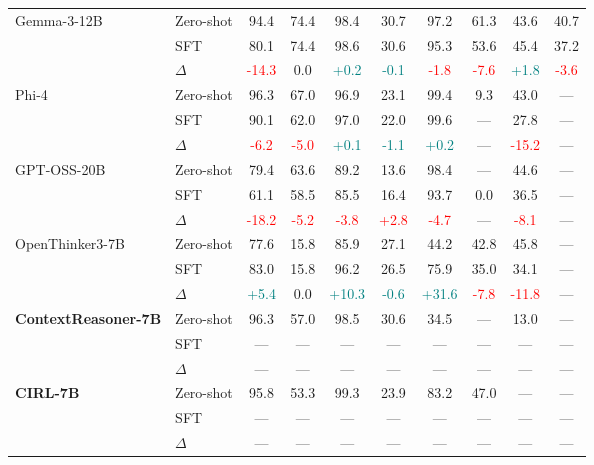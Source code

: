 \begin{table}[t]
\begin{tabular}{llcccccccc}
\addlinespace
Gemma-3-12B & Zero-shot & 94.4 & 74.4 & 98.4 & 30.7 & 97.2 & 61.3 & 43.6 & 40.7 \\
 & SFT & 80.1 & 74.4 & 98.6 & 30.6 & 95.3 & 53.6 & 45.4 & 37.2 \\
 & $\Delta$ & \textcolor{red}{-14.3} & 0.0 & \textcolor{teal}{+0.2} & \textcolor{teal}{-0.1} & \textcolor{red}{-1.8} & \textcolor{red}{-7.6} & \textcolor{teal}{+1.8} & \textcolor{red}{-3.6} \\
\addlinespace
Phi-4 & Zero-shot & 96.3 & 67.0 & 96.9 & 23.1 & 99.4 & 9.3 & 43.0 & --- \\
 & SFT & 90.1 & 62.0 & 97.0 & 22.0 & 99.6 & --- & 27.8 & --- \\
 & $\Delta$ & \textcolor{red}{-6.2} & \textcolor{red}{-5.0} & \textcolor{teal}{+0.1} & \textcolor{teal}{-1.1} & \textcolor{teal}{+0.2} & --- & \textcolor{red}{-15.2} & --- \\
\addlinespace
GPT-OSS-20B & Zero-shot & 79.4 & 63.6 & 89.2 & 13.6 & 98.4 & --- & 44.6 & --- \\
 & SFT & 61.1 & 58.5 & 85.5 & 16.4 & 93.7 & 0.0 & 36.5 & --- \\
 & $\Delta$ & \textcolor{red}{-18.2} & \textcolor{red}{-5.2} & \textcolor{red}{-3.8} & \textcolor{red}{+2.8} & \textcolor{red}{-4.7} & --- & \textcolor{red}{-8.1} & --- \\
\addlinespace
OpenThinker3-7B & Zero-shot & 77.6 & 15.8 & 85.9 & 27.1 & 44.2 & 42.8 & 45.8 & --- \\
 & SFT & 83.0 & 15.8 & 96.2 & 26.5 & 75.9 & 35.0 & 34.1 & --- \\
 & $\Delta$ & \textcolor{teal}{+5.4} & 0.0 & \textcolor{teal}{+10.3} & \textcolor{teal}{-0.6} & \textcolor{teal}{+31.6} & \textcolor{red}{-7.8} & \textcolor{red}{-11.8} & --- \\
\addlinespace
\textbf{ContextReasoner-7B} & Zero-shot & 96.3 & 57.0 & 98.5 & 30.6 & 34.5 & --- & 13.0 & --- \\
 & SFT & --- & --- & --- & --- & --- & --- & --- & --- \\
 & $\Delta$ & --- & --- & --- & --- & --- & --- & --- & --- \\
\addlinespace
\textbf{CIRL-7B} & Zero-shot & 95.8 & 53.3 & 99.3 & 23.9 & 83.2 & 47.0 & --- & --- \\
 & SFT & --- & --- & --- & --- & --- & --- & --- & --- \\
 & $\Delta$ & --- & --- & --- & --- & --- & --- & --- & --- \\
\bottomrule
\end{tabular}
\end{table}